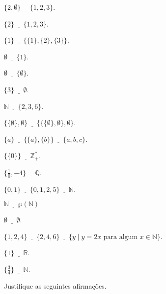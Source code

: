 \begin{exerList}
\item $\{2, \emptyset\} \underline{ \ \ \ \ \ \ } \{1, 2, 3\}$.
	\item $\{2\} \underline{ \ \ \ \ \ \ } \{1, 2, 3\}$.
	\item $\{1\} \underline{ \ \ \ \ \ \ } \{\{1\}, \{2\}, \{3\}\}$.
	\item $\emptyset \underline{ \ \ \ \ \ \ } \{1\}$.
	\item $\emptyset \underline{ \ \ \ \ \ \ } \{\emptyset\}$.
	\item $\{3\} \underline{ \ \ \ \ \ \ } \emptyset$.
	\item $\mathbb{N} \underline{ \ \ \ \ \ \ } \{2, 3, 6\}$.
	\item $\{\{\emptyset\}, \emptyset\} \underline{ \ \ \ \ \ \ } \{\{\{\emptyset\}, \emptyset\}, \emptyset\}$.
  \item $\{a\} \underline{ \ \ \ \ \ \ } \{\{a\}, \{b\} \} \underline{ \ \ \ \ \ \ } \{a, b, c\}$.
  \item $\{\{0\}\} \underline{ \ \ \ \ \ \ }  \mathbb{Z}_+^*$.
  \item $\Big\{\frac{1}{0}, -4\} \underline{ \ \ \ \ \ \ }  \mathbb{Q}$.
	\item $\{0,1\} \underline{ \ \ \ \ \ \ } \{0,1, 2, 5\} \underline{ \ \ \ \ \ \ } \mathbb{N}$.
	\item $\mathbb{N} \underline{ \ \ \ \ \ \ } \wp(\mathbb{N})$
	\item $\emptyset \underline{ \ \ \ \ \ \ }  \emptyset$.
	\item $\{1, 2, 4\} \underline{ \ \ \ \ \ \ }  \{2, 4, 6\} \underline{ \ \ \ \ \ \ } \{y \mid y = 2x \mbox{ para algum } x \in \mathbb{N}\}$.
	\item $\{1\} \underline{ \ \ \ \ \ \ }  \mathbb{R}$.
  \item $\Big\{\frac{3}{4}\Big\} \underline{ \ \ \ \ \ \ }  \mathbb{N}$.
\end{exerList}

\begin{questao}\label{test:Conjuntos8}
	Justifique as seguintes afirmações.
\end{questao}

